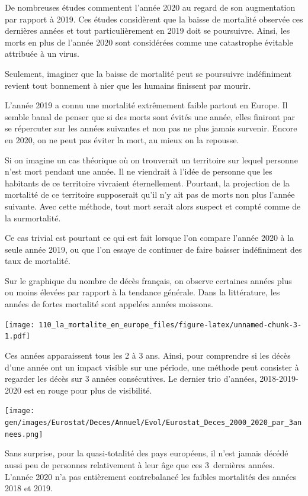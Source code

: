 \documentclass[
]{article}
\begin{document}
De nombreuses études commentent l'année 2020 au regard de son
augmentation par rapport à 2019. Ces études considèrent que la baisse de
mortalité observée ces dernières années et tout particulièrement en 2019
doit se poursuivre. Ainsi, les morts en plus de l'année 2020 sont
considérées comme une catastrophe évitable attribuée à un virus.

Seulement, imaginer que la baisse de mortalité peut se poursuivre
indéfiniment revient tout bonnement à nier que les humains finissent par
mourir.

L'année 2019 a connu une mortalité extrêmement faible partout en Europe.
Il semble banal de penser que si des morts sont évités une année, elles
finiront par se répercuter sur les années suivantes et non pas ne plus
jamais survenir. Encore en 2020, on ne peut pas éviter la mort, au mieux
on la repousse.

Si on imagine un cas théorique où on trouverait un territoire sur lequel
personne n'est mort pendant une année. Il ne viendrait à l'idée de
personne que les habitants de ce territoire vivraient éternellement.
Pourtant, la projection de la mortalité de ce territoire supposerait
qu'il n'y ait pas de morts non plus l'année suivante. Avec cette
méthode, tout mort serait alors suspect et compté comme de la
surmortalité.

Ce cas trivial est pourtant ce qui est fait lorsque l'on compare l'année
2020 à la seule année 2019, ou que l'on essaye de continuer de faire
baisser indéfiniment des taux de mortalité.

Sur le graphique du nombre de décès français, on observe certaines
années plus ou moins élevées par rapport à la tendance générale. Dans la
littérature, les années de fortes mortalité sont appelées années
moissons.

\texttt{[image: 110\_la\_mortalite\_en\_europe\_files/figure-latex/unnamed-chunk-3-1.pdf]}

Ces années apparaissent tous les 2 à 3 ans. Ainsi, pour comprendre si
les décès d'une année ont un impact visible sur une période, une méthode
peut consister à regarder les décès sur 3 années consécutives. Le
dernier trio d'années, 2018-2019-2020 est en rouge pour plus de
visibilité.

\texttt{[image: gen/images/Eurostat/Deces/Annuel/Evol/Eurostat\_Deces\_2000\_2020\_par\_3annees.png]}

Sans surprise, pour la quasi-totalité des pays européens, il n'est
jamais décédé aussi peu de personnes relativement à leur âge que ces
3~dernières années. L'année 2020 n'a pas entièrement contrebalancé les
faibles mortalités des années 2018 et 2019.
\end{document}
